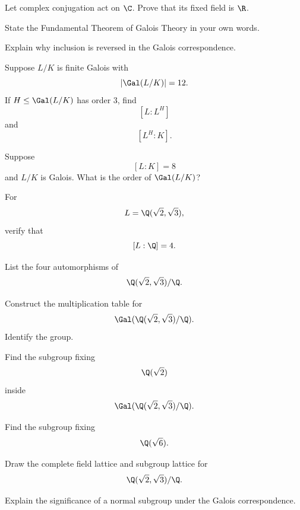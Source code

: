 \begin{exercise}[2]
Let complex conjugation act on \(\C\). Prove that its fixed field is \(\R\).
\end{exercise}

\begin{exercise}[2]
State the Fundamental Theorem of Galois Theory in your own words.
\end{exercise}

\begin{exercise}[2]
Explain why inclusion is reversed in the Galois correspondence.
\end{exercise}

\begin{exercise}[2]
Suppose \(L/K\) is finite Galois with
\[ |\Gal(L/K)|=12. \]
If \(H\leq\Gal(L/K)\) has order \(3\), find
\[ [L:L^H] \]
and
\[ [L^H:K]. \]
\end{exercise}

\begin{exercise}[2]
Suppose
\[ [L:K]=8 \]
and \(L/K\) is Galois. What is the order of \(\Gal(L/K)\)?
\end{exercise}

\begin{exercise}[2]
For
\[ L=\Q(\sqrt2,\sqrt3), \]
verify that
\[ [L:\Q]=4. \]
\end{exercise}

\begin{exercise}[2]
List the four automorphisms of
\[ \Q(\sqrt2,\sqrt3)/\Q. \]
\end{exercise}

\begin{exercise}[3]
Construct the multiplication table for
\[ \Gal(\Q(\sqrt2,\sqrt3)/\Q). \]
Identify the group.
\end{exercise}

\begin{exercise}[3]
Find the subgroup fixing
\[ \Q(\sqrt2) \]
inside
\[ \Gal(\Q(\sqrt2,\sqrt3)/\Q). \]
\end{exercise}

\begin{exercise}[3]
Find the subgroup fixing
\[ \Q(\sqrt6). \]
\end{exercise}

\begin{exercise}[3]
Draw the complete field lattice and subgroup lattice for
\[ \Q(\sqrt2,\sqrt3)/\Q. \]
\end{exercise}

\begin{exercise}[2]
Explain the significance of a normal subgroup under the Galois
correspondence.
\end{exercise}

